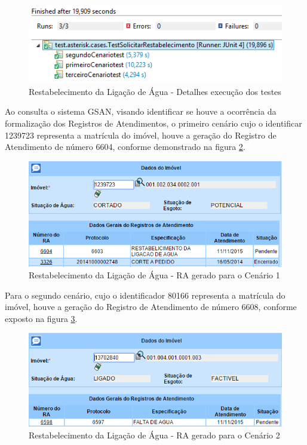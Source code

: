 \begin{figure}[H]
	\centering
	\caption{Restabelecimento da Ligação de Água - Detalhes execução dos testes}
	\label{figura:restabelecimentoJUnit}
	\includegraphics{figuras/cenarios/restabelecimento/junit_result.PNG}
\end{figure}

Ao consulta o sistema GSAN, visando identificar se houve a ocorrência da formalização dos Registros de Atendimentos, o primeiro cenário cujo o identificar 1239723 representa a matrícula do imóvel, houve a geração do Registro de Atendimento de número 6604, conforme demonstrado na figura \ref{figura:restabelecimentoRA1}.

\begin{figure}[H]
	\centering
	\caption{Restabelecimento da Ligação de Água - RA gerado para o Cenário 1}
	\label{figura:restabelecimentoRA1}
	\includegraphics{figuras/cenarios/restabelecimento/resultado_1.PNG}
\end{figure}

Para o segundo cenário, cujo o identificador 80166 representa a matrícula do imóvel, houve a geração do Registro de Atendimento de número 6608, conforme exposto na figura \ref{figura:restabelecimentoRA2}.	

\begin{figure}[H]
	\centering
	\caption{Restabelecimento da Ligação de Água - RA gerado para o Cenário 2}
	\label{figura:restabelecimentoRA2}
	\includegraphics{figuras/cenarios/informar_falta_agua/resultado_2.PNG}
\end{figure}
	
